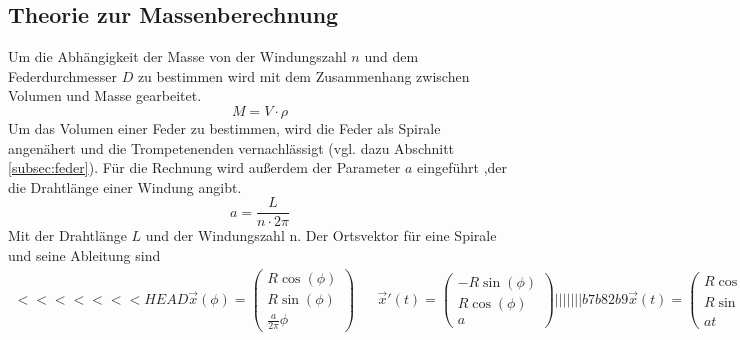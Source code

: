 \subsection{Theorie zur Massenberechnung}
Um die Abhängigkeit der Masse von der Windungszahl $n$ und dem Federdurchmesser $D$ zu bestimmen wird mit dem Zusammenhang zwischen Volumen und Masse gearbeitet.
\begin{equation}
    M = V \cdot \rho
\end{equation}
Um das Volumen einer Feder zu bestimmen, wird die Feder als Spirale angenähert und die Trompetenenden vernachlässigt (vgl. dazu Abschnitt \ref{subsec:feder}).
Für die Rechnung wird außerdem der Parameter $a$ eingeführt ,der die Drahtlänge einer Windung angibt.
\begin{equation}
    a = \frac{L}{n\cdot 2\pi}
\end{equation}
Mit der Drahtlänge $L$ und der Windungszahl n.
Der Ortsvektor für eine Spirale und seine Ableitung sind
\begin{align}
<<<<<<< HEAD
    \vec{x}(\phi) = \left(\begin{array}{c} R\cos( \phi ) \\ R\sin( \phi ) \\ \frac{a}{2\pi} \phi \end{array}\right) && \vec{x}'(t) = \left(\begin{array}{c} -R\sin( \phi ) \\ R\cos( \phi ) \\ a \end{array}\right)
||||||| b7b82b9
    \vec{x}(t) = \left(\begin{array}{c} R\cos(t) \\ R\sin(t) \\ at\end{array}\right) && \vec{x}'(t) = \left(\begin{array}{c} -R\sin(t) \\ R\cos(t) \\ a \end{array}\right)
=======
    \vec{x}(t) = \left(\begin{array}{c} R\cos(t) \\ R\sin(t) \\ at\end{array}\right), && \vec{x}'(t) = \left(\begin{array}{c} -R\sin(t) \\ R\cos(t) \\ a \end{array}\right).
>>>>>>> b4bc21bf6b3b68e50b94a03ed79fc69dac8aea83
\end{align}
